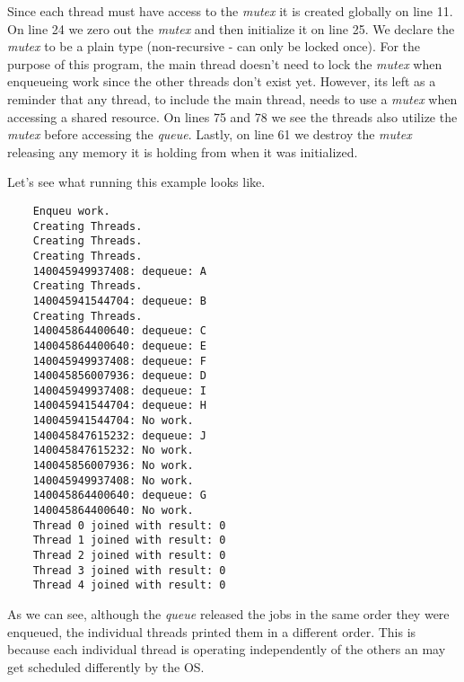 \documentclass[../main.tex]{subfiles}
\begin{document}
	Since each thread must have access to the \textit{mutex} it is created globally on line 11.  On line 24 we zero out the \textit{mutex} and then initialize it on line 25.  We declare the \textit{mutex} to be a plain type (non-recursive - can only be locked once).  For the purpose of this program, the main thread doesn't need to lock the \textit{mutex} when enqueueing work since the other threads don't exist yet.  However, its left as a reminder that any thread, to include the main thread, needs to use a \textit{mutex} when accessing a shared resource.  On lines 75 and 78 we see the threads also utilize the \textit{mutex} before accessing the \textit{queue}.  Lastly, on line 61 we destroy the \textit{mutex} releasing any memory it is holding from when it was initialized.
	
	Let's see what running this example looks like.
	
	\begin{verbatim}
	Enqueu work.
	Creating Threads.
	Creating Threads.
	Creating Threads.
	140045949937408: dequeue: A
	Creating Threads.
	140045941544704: dequeue: B
	Creating Threads.
	140045864400640: dequeue: C
	140045864400640: dequeue: E
	140045949937408: dequeue: F
	140045856007936: dequeue: D
	140045949937408: dequeue: I
	140045941544704: dequeue: H
	140045941544704: No work.
	140045847615232: dequeue: J
	140045847615232: No work.
	140045856007936: No work.
	140045949937408: No work.
	140045864400640: dequeue: G
	140045864400640: No work.
	Thread 0 joined with result: 0
	Thread 1 joined with result: 0
	Thread 2 joined with result: 0
	Thread 3 joined with result: 0
	Thread 4 joined with result: 0
	\end{verbatim}
	
	As we can see, although the \textit{queue} released the jobs in the same order they were enqueued, the individual threads printed them in a different order.  This is because each individual thread is operating independently of the others an may get scheduled differently by the OS.  
	
\end{document}
